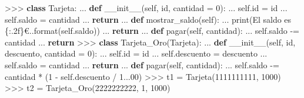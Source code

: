 \documentclass[
  spanish,
  a4paper,
]{scrreport}
\newenvironment{Shaded}{\begin{snugshade}}{\end{snugshade}}
\newcommand{\BuiltInTok}[1]{\textcolor[rgb]{0.00,0.23,0.31}{#1}}
\newcommand{\ControlFlowTok}[1]{\textcolor[rgb]{0.00,0.23,0.31}{\textbf{#1}}}
\newcommand{\DecValTok}[1]{\textcolor[rgb]{0.68,0.00,0.00}{#1}}
\newcommand{\FloatTok}[1]{\textcolor[rgb]{0.68,0.00,0.00}{#1}}
\newcommand{\FunctionTok}[1]{\textcolor[rgb]{0.28,0.35,0.67}{#1}}
\newcommand{\KeywordTok}[1]{\textcolor[rgb]{0.00,0.23,0.31}{\textbf{#1}}}
\newcommand{\NormalTok}[1]{\textcolor[rgb]{0.00,0.23,0.31}{#1}}
\newcommand{\OperatorTok}[1]{\textcolor[rgb]{0.37,0.37,0.37}{#1}}
\newcommand{\SpecialCharTok}[1]{\textcolor[rgb]{0.37,0.37,0.37}{#1}}
\newcommand{\StringTok}[1]{\textcolor[rgb]{0.13,0.47,0.30}{#1}}
\newcommand{\VariableTok}[1]{\textcolor[rgb]{0.07,0.07,0.07}{#1}}
\begin{document}
\begin{Shaded}
\begin{Highlighting}[]
\OperatorTok{\textgreater{}\textgreater{}\textgreater{}} \KeywordTok{class}\NormalTok{ Tarjeta:}
\NormalTok{...     }\KeywordTok{def} \FunctionTok{\_\_init\_\_}\NormalTok{(}\VariableTok{self}\NormalTok{, }\BuiltInTok{id}\NormalTok{, cantidad }\OperatorTok{=} \DecValTok{0}\NormalTok{):}
\NormalTok{...         }\VariableTok{self}\NormalTok{.}\BuiltInTok{id} \OperatorTok{=} \BuiltInTok{id}
\NormalTok{...         }\VariableTok{self}\NormalTok{.saldo }\OperatorTok{=}\NormalTok{ cantidad}
\NormalTok{...         }\ControlFlowTok{return}
\NormalTok{...     }\KeywordTok{def}\NormalTok{ mostrar\_saldo(}\VariableTok{self}\NormalTok{):}
\NormalTok{...         }\BuiltInTok{print}\NormalTok{(}\StringTok{\textquotesingle{}El saldo es }\SpecialCharTok{\{:.2f\}}\StringTok{€.\textquotesingle{}}\NormalTok{.}\BuiltInTok{format}\NormalTok{(}\VariableTok{self}\NormalTok{.saldo))}
\NormalTok{...         }\ControlFlowTok{return}
\NormalTok{...     }\KeywordTok{def}\NormalTok{ pagar(}\VariableTok{self}\NormalTok{, cantidad):}
\NormalTok{...         }\VariableTok{self}\NormalTok{.saldo }\OperatorTok{{-}=}\NormalTok{ cantidad}
\NormalTok{...         }\ControlFlowTok{return}
\OperatorTok{\textgreater{}\textgreater{}\textgreater{}} \KeywordTok{class}\NormalTok{ Tarjeta\_Oro(Tarjeta):}
\NormalTok{...     }\KeywordTok{def} \FunctionTok{\_\_init\_\_}\NormalTok{(}\VariableTok{self}\NormalTok{, }\BuiltInTok{id}\NormalTok{, descuento, cantidad }\OperatorTok{=} \DecValTok{0}\NormalTok{):}
\NormalTok{...         }\VariableTok{self}\NormalTok{.}\BuiltInTok{id} \OperatorTok{=} \BuiltInTok{id}
\NormalTok{...         }\VariableTok{self}\NormalTok{.descuento }\OperatorTok{=}\NormalTok{ descuento}
\NormalTok{...         }\VariableTok{self}\NormalTok{.saldo }\OperatorTok{=}\NormalTok{ cantidad}
\NormalTok{...         }\ControlFlowTok{return}
\NormalTok{...     }\KeywordTok{def}\NormalTok{ pagar(}\VariableTok{self}\NormalTok{, cantidad):}
\NormalTok{...         }\VariableTok{self}\NormalTok{.saldo }\OperatorTok{{-}=}\NormalTok{ cantidad }\OperatorTok{*}\NormalTok{ (}\DecValTok{1} \OperatorTok{{-}} \VariableTok{self}\NormalTok{.descuento }\OperatorTok{/} \FloatTok{1.}\NormalTok{.}\FloatTok{.00}\NormalTok{)}
\OperatorTok{\textgreater{}\textgreater{}\textgreater{}}\NormalTok{ t1 }\OperatorTok{=}\NormalTok{ Tarjeta(}\StringTok{\textquotesingle{}1111111111\textquotesingle{}}\NormalTok{, }\DecValTok{1000}\NormalTok{)}
\OperatorTok{\textgreater{}\textgreater{}\textgreater{}}\NormalTok{ t2 }\OperatorTok{=}\NormalTok{ Tarjeta\_Oro(}\StringTok{\textquotesingle{}2222222222\textquotesingle{}}\NormalTok{, }\DecValTok{1}\NormalTok{, }\DecValTok{1000}\NormalTok{)}

\end{Highlighting}
\end{Shaded}
\end{document}
